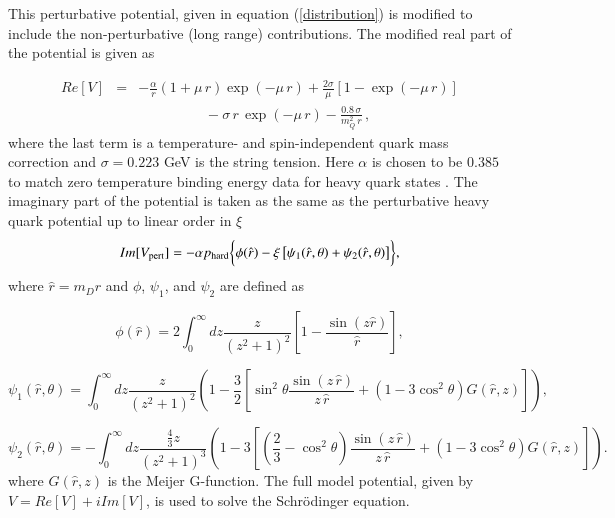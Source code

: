{This perturbative potential, given in equation (\ref{distribution}) is modified to include the non-perturbative (long range) contributions. 
The modified real part of the potential is given as~\cite{Dumitru:2007hy} 


%
\begin{eqnarray} 
\label{eq:repot}
Re[V] &=& -\frac{\alpha}{r} \left(1+\mu \, r\right) \exp\left( -\mu
\, r  \right) + \frac{2\sigma}{\mu}\left[1-\exp\left( -\mu
\, r  \right)\right] \nonumber \\
&& \hspace{2cm} - \sigma \,r\, \exp(-\mu\,r)- \frac{0.8 \, \sigma}{m_Q^2\, r} \, ,
\end{eqnarray}
%
where the last term is a temperature- and spin-independent quark mass correction 
\cite{Bali:1997am} and $\sigma = 0.223$ GeV is the string tension.  Here  $\alpha$ 
is chosen to be  $0.385$ 
to match zero temperature
binding energy data for heavy quark states \cite{Dumitru:2007hy}.
The imaginary part of the potential is taken as the same as the perturbative heavy quark
potential up to linear order in $\xi$ 
%
\begin{equation} 
Im[V_{\rm pert}] = -\alpha p_{\rm hard} \biggl\{ \phi(\hat{r}) - \xi \left[\psi_1(\hat{r},
\theta)+\psi_2(\hat{r}, \theta)\right]\biggr\} ,
\label{eq:impot}
\end{equation}
%
where $\hat{r}=m_D r$ and $\phi$, $\psi_1$, and $\psi_2$ are defined as


\begin{equation}
\phi(\hat{r}) = 2\int_{0}^{\infty} dz \frac{z}{(z^2+1)^2}\left[1-\frac{\sin\left(z\hat{r}\right)}{\hat{r}}\right],
\end{equation}

\begin{equation}
 \psi_1(\hat{r}, \theta) = \int_0^{\infty} dz
 \frac{z}{(z^2+1)^2}\left(1-\frac{3}{2}
 \left[\sin^2\theta\frac{\sin(z\, \hat{r})}{z\, \hat{r}}
 +(1-3\cos^2\theta)G(\hat{r}, z)\right]\right),
 \end{equation}

 \begin{equation}
 \psi_2(\hat{r}, \theta) = - \int_0^{\infty} dz
\frac{\frac{4}{3}z}{(z^2+1)^3}\left(1-3 \left[
  \left(\frac{2}{3}-\cos^2\theta \right) \frac
 {\sin(z\, \hat{r})}{z\, \hat{r}}+(1-3\cos^2\theta)
 G(\hat{r},z)\right]\right).
\label{eq:psis}
\end{equation}
where $G(\hat{r},z)$ is the Meijer G-function. The full model potential, given by $V = Re[V] + i Im[V]$, is used to 
solve the Schr\"odinger equation. 


}
